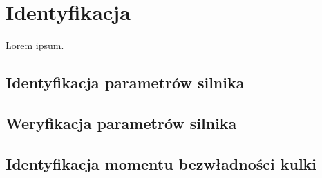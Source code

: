 \chapter{Identyfikacja}
\label{cha:ch6_identyfikacja}

Lorem ipsum.

\section{Identyfikacja parametrów silnika}
\label{sec:identyfikacja_parametrow_silnika}

\section{Weryfikacja parametrów silnika}
\label{sec:weryfikacja_parametrow_silnika}

\section{Identyfikacja momentu bezwładności kulki}
\label{sec:identyfikacja_bezwladnosci_kulki}

